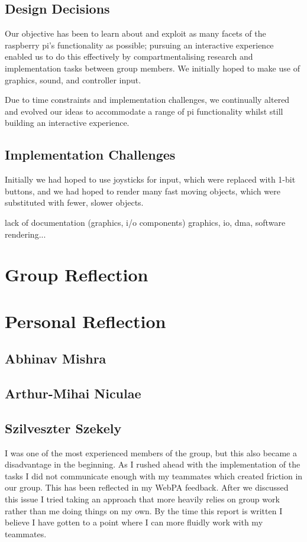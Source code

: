 \documentclass[11pt]{article}
\begin{document}
\subsection{Design Decisions}
Our objective has been to learn about and exploit as many facets of the 
raspberry pi's functionality as possible; pursuing an interactive experience 
enabled us to do this effectively by compartmentalising research and 
implementation tasks between group members. We initially hoped to make use 
of graphics, sound, and controller input.

Due to time constraints and implementation challenges, we continually altered 
and evolved our ideas to accommodate a range of pi functionality whilst still 
building an interactive experience.
\subsection{Implementation Challenges}
Initially we had hoped to use joysticks for input, which were replaced with 
1-bit buttons, and we had hoped to render many fast moving objects, which were 
substituted with fewer, slower objects.

lack of documentation (graphics, i/o components)
graphics, io, dma, software rendering... 
\section{Group Reflection}

\section{Personal Reflection}

\subsection{Abhinav Mishra}

\subsection{Arthur-Mihai Niculae}

\subsection{Szilveszter Szekely}

I was one of the most experienced members of the group, but this also became
a disadvantage in the beginning. As I rushed ahead with the implementation of
the tasks I did not communicate enough with my teammates which created friction
in our group. This has been reflected in my WebPA feedback. After we discussed
this issue I tried taking an approach that more heavily relies on group work
rather than me doing things on my own. By the time this report is written
I believe I have gotten to a point where I can more fluidly work with my
teammates.
\end{document}

